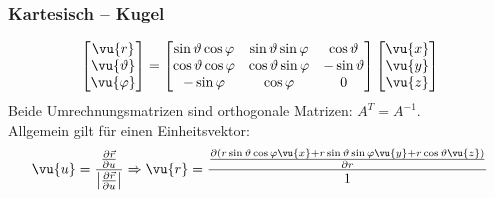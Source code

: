 \subsubsection{Kartesisch -- Kugel} \label{kartkug}
\begin{equation}
	\begin{bmatrix}
		\vu{r}         \\
		\vu{\vartheta} \\
		\vu{\varphi}
	\end{bmatrix}
	=
	\begin{bmatrix}
		\sin\vartheta\cos\varphi & \sin\vartheta\sin\varphi & \cos\vartheta   \\
		\cos\vartheta\cos\varphi & \cos\vartheta\sin\varphi & - \sin\vartheta \\
		-\sin\varphi             & \cos\varphi              & 0
	\end{bmatrix}
	\begin{bmatrix}
		\vu{x} \\
		\vu{y} \\
		\vu{z}
	\end{bmatrix}
\end{equation}
Beide Umrechnungsmatrizen sind orthogonale Matrizen: $A^T=A^{-1}$.\\
Allgemein gilt für einen Einheitsvektor:
\begin{equation}
	\vu{u}=\frac{\frac{\partial\vec{r}}{\partial u}}{\left|\frac{\partial\vec{r}}{\partial u}\right|} \Rightarrow \vu{r}=\frac{\frac{\partial\left( r\sin\vartheta\cos\varphi \vu{x}+ r\sin\vartheta\sin\varphi \vu{y}+ r\cos\vartheta\vu{z}\right)}{\partial r}}{1}
\end{equation}
